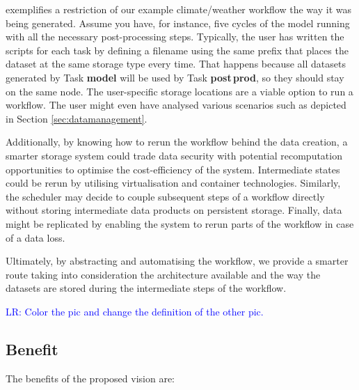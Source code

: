 \documentclass{superfri}
\newcommand{\lr}[1]{\textcolor{blue}{LR: #1}}
\begin{document}
 exemplifies a restriction of our example climate/weather workflow the way it was being generated.
Assume you have, for instance, five cycles of the model running with all the necessary post-processing steps.
Typically, the user has written the scripts for each task by defining a filename using the same prefix that places the dataset at the same storage type every time.
That happens because all datasets generated by Task \textbf{model} will be used by Task \textbf{post\,prod}, so they should stay on the same node.
The user-specific storage locations are a viable option to run a workflow.
The user might even have analysed various scenarios such as depicted in
Section \ref{sec:datamanagement}.

Additionally, by knowing how to rerun the workflow behind the data creation, a smarter storage system could trade data security with potential recomputation opportunities to optimise the cost-efficiency of the system.
Intermediate states could be rerun by utilising virtualisation and container technologies.
Similarly, the scheduler may decide to couple subsequent steps of a workflow directly without storing intermediate data products on persistent storage.
Finally, data might be replicated by enabling the system to rerun parts of the workflow in case of a data loss.

Ultimately, by abstracting and automatising the workflow, we provide a smarter route taking into consideration the architecture available and the way the datasets are stored during the intermediate steps of the workflow.


\lr{Color the pic and change the definition of the other pic.}

\subsection{Benefit}

The benefits of the proposed vision are:
\end{document}

